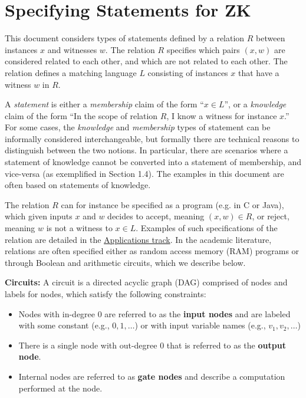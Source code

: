 \section{Specifying Statements for ZK}
\label{security:spec-statements-ZK}

 
	This document considers types of statements defined by a relation $R$ between instances $x$ and witnesses $w$.
	The relation $R$ specifies which pairs $(x,w)$ are considered related to each other, and which are not related to each other.
	The relation defines a matching language $L$ consisting of instances $x$ that have a witness $w$ in $R$.

	A \emph{statement} is either a \emph{membership} claim of the form ``$x \in L$'', 
or a \emph{knowledge} claim of the form ``In the scope of relation $R$, I know a witness for instance $x$.''
	For some cases, the \emph{knowledge} and \emph{membership} types of statement can be informally considered interchangeable, but formally there are technical reasons to distinguish between the two notions. 
	In particular, there are scenarios where a statement of knowledge cannot be converted into a statement of membership, and vice-versa (as exemplified in Section 1.4).
	The examples in this document are often based on statements of knowledge.
	

 
	The relation $R$ can for instance be specified as a program (e.g. in C or Java), which given inputs $x$ and $w$ decides to accept, meaning $(x,w) \in R$, or reject, meaning $w$ is not a witness to $x \in L$. 
	Examples of such specifications of the relation are detailed in the \hyperref[chap:apps]{Applications track}.
	In the academic literature, relations are often specified either as 
random access memory (RAM)
programs or through %
Boolean
and arithmetic circuits, which we describe below.


\textbf{Circuits:} A circuit is a directed acyclic graph (DAG) comprised of nodes and labels for nodes, which satisfy the following constraints:
\begin{itemize}
\item Nodes with in-degree 0 are referred to as the \textbf{input nodes} and are labeled with some constant (e.g., $0, 1, \ldots$) or with input variable names (e.g., $v_1, v_2, \ldots$)
\item There is a single node with out-degree 0 that is referred to as the \textbf{output node}.
\item Internal nodes are referred to as \textbf{gate nodes} and describe a computation performed at the node.\loosen
\end{itemize}


